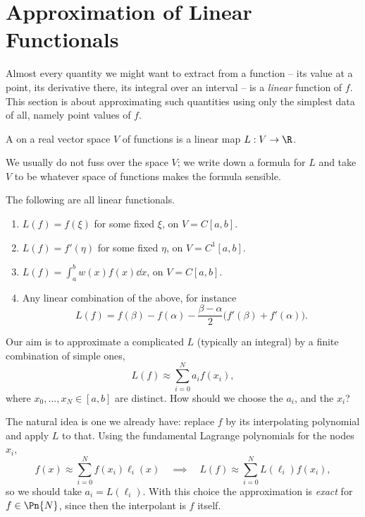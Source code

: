 \section{Approximation of Linear Functionals}

Almost every quantity we might want to extract from a function -- its value at a point, its derivative there, its integral over an interval -- is a \emph{linear} function of $f$. This section is about approximating such quantities using only the simplest data of all, namely point values of $f$.

\begin{definition}
  A  on a real vector space $V$ of functions is a linear map $L: V \to \R$.
\end{definition}

We usually do not fuss over the space $V$; we write down a formula for $L$ and take $V$ to be whatever space of functions makes the formula sensible.

\begin{example}
  The following are all linear functionals.
  \begin{enumerate}[label=(\roman*)]
    \item $L(f) = f(\xi)$ for some fixed $\xi$, on $V = C[a,b]$.
    \item $L(f) = f'(\eta)$ for some fixed $\eta$, on $V = C^1[a,b]$.
    \item $L(f) = \int_a^b w(x)f(x)\dd x$, on $V = C[a,b]$.
    \item Any linear combination of the above, for instance
    $$
    L(f) = f(\beta) - f(\alpha) - \frac{\beta - \alpha}{2}\big(f'(\beta) + f'(\alpha)\big).
    $$
  \end{enumerate}
\end{example}

Our aim is to approximate a complicated $L$ (typically an integral) by a finite combination of simple ones,
$$
L(f) \approx \sum_{i=0}^{N} a_i f(x_i),
$$
where $x_0, \dots, x_N \in [a,b]$ are distinct. How should we choose the $a_i$, and the $x_i$?

The natural idea is one we already have: replace $f$ by its interpolating polynomial and apply $L$ to that. Using the fundamental Lagrange polynomials for the nodes $x_i$,
$$
f(x) \approx \sum_{i=0}^N f(x_i)\ell_i(x) \quad \implies \quad L(f) \approx \sum_{i=0}^N L(\ell_i)f(x_i),
$$
so we should take $a_i = L(\ell_i)$. With this choice the approximation is \emph{exact} for $f \in \Pn{N}$, since then the interpolant is $f$ itself.

